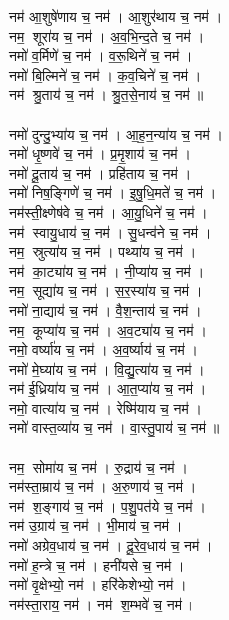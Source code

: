 नम॑ आ॒शुषे॑णाय च॒ नम॑। आ॒शुर॑थाय च॒ नम॑। \\
नम॒ शूरा॑य च॒ नम॑। अ॒व॒भि॒न्द॒ते च॒ नम॑। \\
नमो॑ व॒र्मिणे॑ च॒ नम॑। व॒रू॒थिने॑ च॒ नम॑। \\
नमो॑ बि॒ल्मिने॑ च॒ नम॑। क॒व॒चिने॑ च॒ नम॑। \\
नम॑ श्रु॒ताय॑ च॒ नम॑। श्रु॒त॒से॒नाय॑ च॒ नम॑॥ \\
\\
नमो॑ दुन्दु॒भ्या॑य च॒ नम॑। आ॒ह॒न॒न्या॑य च॒ नम॑। \\
नमो॑ धृ॒ष्णवे॑ च॒ नम॑। प्र॒मृ॒शाय॑ च॒ नम॑।\\
नमो॑ दू॒ताय॑ च॒ नम॑। प्रहि॑ताय च॒ नम॑। \\
नमो॑ निष॒ङ्गिणे॑ च॒ नम॑। इ॒षु॒धि॒मते॑ च॒ नम॑।\\
नम॑स्ती॒क्ष्णेष॑वे च॒ नम॑। आ॒यु॒धिने॑ च॒ नम॑। \\
नम॑ स्वायु॒धाय॑ च॒ नम॑। सु॒धन्व॑ने च॒ नम॑।\\
नम॒ स्रुत्या॑य च॒ नम॑। पथ्या॑य च॒ नम॑। \\
नम॑ का॒ट्या॑य च॒ नम॑। नी॒प्या॑य च॒ नम॑।\\
नम॒ सूद्या॑य च॒ नम॑। स॒र॒स्या॑य च॒ नम॑। \\
नमो॑ ना॒द्याय॑ च॒ नम॑। वै॒श॒न्ताय॑ च॒ नम॑।  \\
नम॒ कूप्या॑य च॒ नम॑। अ॒व॒ट्या॑य च॒ नम॑। \\
नमो॒ वर्ष्या॑य च॒ नम॑। अ॒व॒र्ष्याय॑ च॒ नम॑। \\
नमो॑ मे॒घ्या॑य च॒ नम॑। वि॒द्यु॒त्या॑य च॒ नम॑।\\
नम॑ ई॒ध्रिया॑य च॒ नम॑। आ॒त॒प्या॑य च॒ नम॑।\\
नमो॒ वात्या॑य च॒ नम॑। रेष्मि॑याय च॒ नम॑। \\
नमो॑ वास्त॒व्या॑य च॒ नम॑। वा॒स्तु॒पाय॑ च॒ नम॑॥ \\
\\
नम॒ सोमा॑य च॒ नम॑। रु॒द्राय॑ च॒ नम॑। \\
नम॑स्ता॒म्राय॑ च॒ नम॑। अ॒रु॒णाय॑ च॒ नम॑।\\
नम॑ श॒ङ्गाय॑ च॒ नम॑। प॒शु॒पत॑ये च॒ नम॑। \\
नम॑ उ॒ग्राय॑ च॒ नम॑। भी॒माय॑ च॒ नम॑। \\
नमो॑ अग्रेव॒धाय॑ च॒ नम॑। दू॒रे॒व॒धाय॑ च॒ नम॑।\\
नमो॑ ह॒न्त्रे च॒ नम॑। हनी॑यसे च॒ नम॑। \\
नमो॑ वृ॒क्षेभ्यो॒ नम॑। हरि॑केशेभ्यो॒ नम॑।\\
नम॑स्ता॒राय॒ नम॑। नम॑ श॒म्भवे॑ च॒ नम॑। \\
